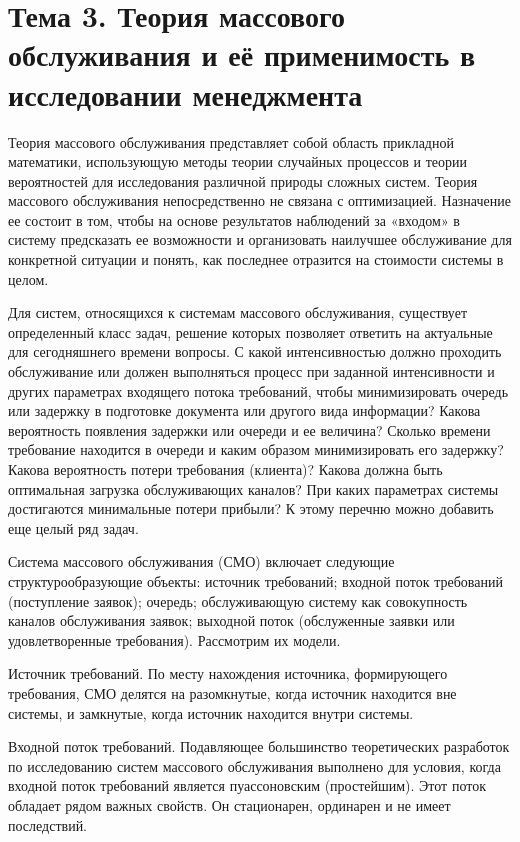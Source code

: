 \section{Тема 3. Теория массового обслуживания и её применимость в исследовании менеджмента}

Теория массового обслуживания представляет собой область прикладной математики, использующую методы теории случайных процессов и теории вероятностей для исследования различной природы сложных систем. Теория массового обслуживания непосредственно не связана с оптимизацией. Назначение ее состоит в том, чтобы на основе результатов наблюдений за «входом» в систему предсказать ее возможности и организовать наилучшее обслуживание для конкретной ситуации и понять, как последнее отразится на стоимости системы в целом. 

Для систем, относящихся к системам массового обслуживания, существует определенный класс задач, решение которых позволяет ответить на актуальные для сегодняшнего времени вопросы. С какой интенсивностью должно проходить обслуживание или должен выполняться процесс при заданной интенсивности и других параметрах входящего потока требований, чтобы минимизировать очередь или задержку в подготовке документа или другого вида информации? Какова вероятность появления задержки или очереди и ее величина? Сколько времени требование находится в очереди и каким образом минимизировать его задержку? Какова вероятность потери требования (клиента)? Какова должна быть оптимальная загрузка обслуживающих каналов? При каких параметрах системы достигаются минимальные потери прибыли? К этому перечню можно добавить еще целый ряд задач.

Система массового обслуживания (СМО) включает следующие структурообразующие объекты: источник требований; входной поток требований (поступление заявок); очередь; обслуживающую систему как совокупность каналов обслуживания заявок; выходной поток (обслуженные заявки или удовлетворенные требования). Рассмотрим их модели.

Источник требований. По месту нахождения источника, формирующего требования, СМО делятся на разомкнутые, когда источник находится вне системы, и замкнутые, когда источник находится внутри системы.

Входной поток требований. Подавляющее большинство теоретических разработок по исследованию систем массового обслуживания выполнено для условия, когда входной поток требований является пуассоновским (простейшим). Этот поток обладает рядом важных свойств. Он стационарен, ординарен и не имеет последствий.

